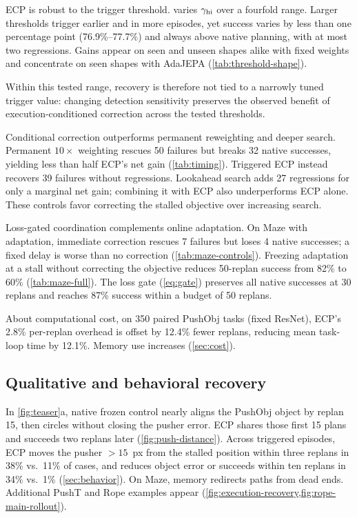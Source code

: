 

\par\smallskip\noindent ECP is robust to the trigger threshold.
 varies $\gamma_{\rm hi}$ over a fourfold range. Larger thresholds trigger earlier and in more episodes, yet success varies by less than one percentage point (76.9\%--77.7\%) and always above native planning, with at most two regressions. Gains appear on seen and unseen shapes alike with fixed weights and concentrate on seen shapes with AdaJEPA (\cref{tab:threshold-shape}).

Within this tested range, recovery is therefore not tied to a narrowly tuned trigger value: changing detection sensitivity preserves the observed benefit of execution-conditioned correction across the tested thresholds.



\par\smallskip\noindent Conditional correction outperforms permanent reweighting and deeper search.
Permanent $10\times$ weighting rescues 50 failures but breaks 32 native successes, yielding less than half ECP's net gain (\cref{tab:timing}). Triggered ECP instead recovers 39 failures without regressions. Lookahead search adds 27 regressions for only a marginal net gain; combining it with ECP also underperforms ECP alone. These controls favor correcting the stalled objective over increasing search.

\par\smallskip\noindent Loss-gated coordination complements online adaptation.
On Maze with adaptation, immediate correction rescues 7 failures but loses 4 native successes; a fixed delay is worse than no correction (\cref{tab:maze-controls}). Freezing adaptation at a stall without correcting the objective reduces 50-replan success from 82\% to 60\% (\cref{tab:maze-full}). The loss gate (\cref{eq:gate}) preserves all native successes at 30 replans and reaches 87\% success within a budget of 50 replans.

\par\smallskip\noindent About computational cost, on 350 paired PushObj tasks (fixed ResNet), ECP's 2.8\% per-replan overhead is offset by 12.4\% fewer replans, reducing mean task-loop time by 12.1\%. Memory use increases (\cref{sec:cost}).

\subsection{Qualitative and behavioral recovery}
\label{sec:qualitative}
In \cref{fig:teaser}a, native frozen control nearly aligns the PushObj object by replan 15, then circles without closing the pusher error. ECP shares those first 15 plans and succeeds two replans later (\cref{fig:push-distance}). Across triggered episodes, ECP moves the pusher $>15$~px from the stalled position within three replans in 38\% vs.\ 11\% of cases, and reduces object error or succeeds within ten replans in 34\% vs.\ 1\% (\cref{sec:behavior}). On Maze, memory redirects paths from dead ends. Additional PushT and Rope examples appear (\cref{fig:execution-recovery,fig:rope-main-rollout}).

